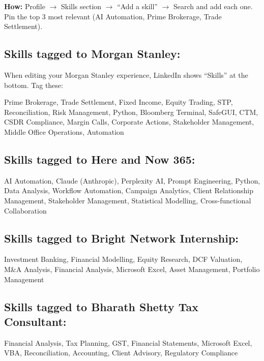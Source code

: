\documentclass[11pt,a4paper]{article}
\begin{document}
\textbf{How:} Profile $\rightarrow$ Skills section $\rightarrow$ ``Add a skill'' $\rightarrow$ Search and add each one. Pin the top 3 most relevant (AI Automation, Prime Brokerage, Trade Settlement).

\subsection{Skills tagged to Morgan Stanley:}

When editing your Morgan Stanley experience, LinkedIn shows ``Skills'' at the bottom. Tag these:

\begin{copybox}
Prime Brokerage, Trade Settlement, Fixed Income, Equity Trading, STP, Reconciliation, Risk Management, Python, Bloomberg Terminal, SafeGUI, CTM, CSDR Compliance, Margin Calls, Corporate Actions, Stakeholder Management, Middle Office Operations, Automation
\end{copybox}

\subsection{Skills tagged to Here and Now 365:}

\begin{copybox}
AI Automation, Claude (Anthropic), Perplexity AI, Prompt Engineering, Python, Data Analysis, Workflow Automation, Campaign Analytics, Client Relationship Management, Stakeholder Management, Statistical Modelling, Cross-functional Collaboration
\end{copybox}

\subsection{Skills tagged to Bright Network Internship:}

\begin{copybox}
Investment Banking, Financial Modelling, Equity Research, DCF Valuation, M\&A Analysis, Financial Analysis, Microsoft Excel, Asset Management, Portfolio Management
\end{copybox}

\subsection{Skills tagged to Bharath Shetty Tax Consultant:}

\begin{copybox}
Financial Analysis, Tax Planning, GST, Financial Statements, Microsoft Excel, VBA, Reconciliation, Accounting, Client Advisory, Regulatory Compliance
\end{copybox}
\end{document}
